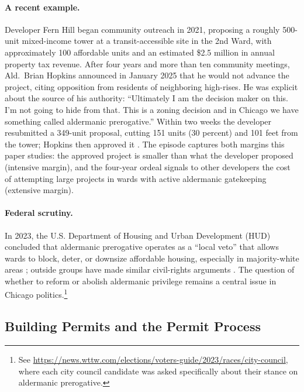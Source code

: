 \paragraph{A recent example.}
Developer Fern Hill began community
outreach in 2021, proposing a roughly 500-unit mixed-income tower at a
transit-accessible site in the 2nd Ward, with approximately 100 affordable units
and an estimated \$2.5 million in annual property tax revenue.
After four years and
more than ten community meetings, Ald.\ Brian Hopkins announced in January 2025
that he would not advance the project, citing opposition from residents of
neighboring high-rises.
He was explicit about the source of his authority:
``Ultimately I am the decision maker on this.
I'm not going to hide from that.
This is a zoning decision and in Chicago we have something called aldermanic
prerogative.''
\citep{achong_shortened_2025} Within two weeks the developer
resubmitted a 349-unit proposal, cutting 151 units (30 percent) and 101 feet from the tower; Hopkins then approved it \citep{real_deal_old_town_2026}.
The episode captures both margins this paper studies: the approved
project is smaller than what the developer proposed (intensive margin), and the
four-year ordeal signals to other developers the cost of attempting large projects
in wards with active aldermanic gatekeeping (extensive margin).

\paragraph{Federal scrutiny.}
In 2023, the U.S. Department of Housing and Urban Development (HUD) concluded that aldermanic prerogative operates as a ``local veto'' that allows wards to block, deter, or downsize affordable housing, especially in majority-white areas \citep{chase_chicago_2023}; outside groups have made similar civil-rights arguments \citep{shriver_center_on_poverty_law_city_2019}.
The question of whether to reform or abolish aldermanic privilege remains a central issue in Chicago politics.\footnote{See
\url{https://news.wttw.com/elections/voters-guide/2023/races/city-council}, where
each city council candidate was asked specifically about their stance on aldermanic
prerogative.}

\subsection{Building Permits and the Permit Process}
\label{subsec:permit_pipeline}

